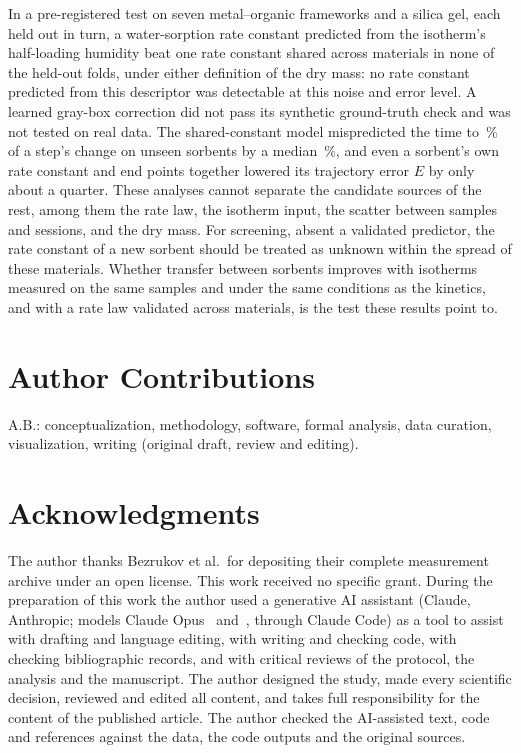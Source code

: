 \documentclass[12pt]{article}
\begin{document}
In a pre-registered test on seven metal--organic frameworks and a silica gel, each held out in turn, a water-sorption
rate constant predicted from the isotherm's half-loading humidity beat one rate constant shared across materials in
none of the held-out folds, under either definition of the dry mass: no rate constant predicted from this descriptor
was detectable at this noise and error level. A learned gray-box correction did not pass its synthetic ground-truth
check and was not tested on real data. The
shared-constant model mispredicted the time to \,\% of a step's change on unseen sorbents by a median
\,\%, and even a sorbent's own rate constant and end points together lowered its trajectory error $E$ by
only about a quarter. These analyses cannot separate the candidate sources of the rest, among them the rate law, the isotherm
input, the scatter between samples and sessions, and the dry mass. For screening, absent a validated predictor, the
rate constant of a new sorbent should be treated as unknown within the spread of these materials. Whether transfer between sorbents improves with
isotherms measured on the same samples and under the same conditions as the kinetics, and with a rate law validated
across materials, is the test these results point to.


\section*{Author Contributions}

A.B.: conceptualization, methodology, software, formal analysis, data curation, visualization, writing (original draft,
review and editing).

\section*{Acknowledgments}

The author thanks Bezrukov et al.\ for depositing their complete measurement archive under an open license. This work
received no specific grant. During the preparation of this work the author used a generative AI assistant (Claude,
Anthropic; models Claude Opus~ and~, through Claude Code) as a tool to assist with drafting and language
editing, with writing and checking code, with checking bibliographic records, and with critical reviews of the
protocol, the analysis and the manuscript. The author designed the study, made
every scientific decision, reviewed and edited all content, and takes full responsibility for the content of the
published article. The author checked the AI-assisted text, code and references against the data, the code outputs
and the original sources.
\end{document}
